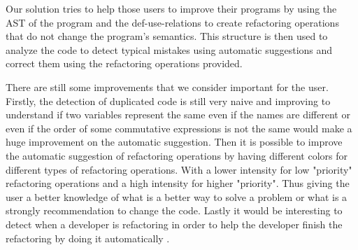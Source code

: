 Our solution tries to help those users to improve their programs by using the AST of
the program and the def-use-relations to create refactoring operations that do not
change the program's semantics. This structure is then used to analyze the code
to detect typical mistakes using automatic suggestions and correct them using the
refactoring operations provided.


There are still some improvements that we consider important for the user.
Firstly, the detection of duplicated code is still very naive and improving to understand if
two variables represent the same even if the names are different or even if the
 order of some commutative expressions is not the same would make a huge improvement
 on the automatic suggestion.
Then it is possible to improve the automatic suggestion of refactoring operations by
having different colors for different types of refactoring operations.
With a lower intensity for low "priority" refactoring operations and a high intensity
for higher "priority". Thus giving the user a better knowledge of what is a better
way to solve a problem or what is a strongly recommendation to change the code.
Lastly it would be interesting to detect when a developer is refactoring in order to help the developer finish the
refactoring by doing it automatically \cite{ge2012reconciling}.
